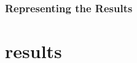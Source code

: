 \documentclass{scrartcl}
\newcommand\todo[1]{\textit{\textcolor{red}{#1}}}
\begin{document}
\subsubsection{Representing the Results}

\section{results}

\end{document}

